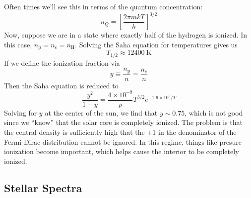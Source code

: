\documentclass[10pt]{article}
\numberwithin{equation}{section}
\begin{document}
    Often times we'll see this in terms of the quantum
      concentration:
    \begin{equation}
      \label{eq:225}
      n_Q=\left[\frac{2\pi mkT}{h}\right]^{3/2}
    \end{equation}
    Now, suppose we are in a state where exactly half of the hydrogen
    is ionized. In this case,
    $n_{\mathrm{p}}=n_e=n_\mathrm{H}$. Solving the Saha equation for
    temperatures gives us
    \begin{equation}
      \label{eq:209}
      T_{1/2}\approx 12400\ \mathrm{K}
    \end{equation}
    If we define the ionization fraction via
    \begin{equation}
      \label{eq:210}
      y\equiv \frac{n_\mathrm{p}}{n}=\frac{n_e}{n}
    \end{equation}
    Then the Saha equation is reduced to
    \begin{equation}
      \label{eq:211}
      \boxed{\frac{y^2}{1-y}=\frac{4\times 10^{-9}}{\rho}T^{3/2}e^
{-1.6\times 10^5/T}}
    \end{equation}
    Solving for $y$ at the center of the sun, we find that $y\sim
    0.75$, which is not good since we ``know'' that the solar core is
    completely ionized. The problem is that the central density is
    sufficiently high that the $+1$ in the denominator of the
    Fermi-Dirac distribution cannot be ignored. In this regime, things
    like presure ionization become important, which helps cause the
    interior to be completely ionized.

    \subsection{Stellar Spectra}
    \label{sec:stellar-spectra}
\end{document}
